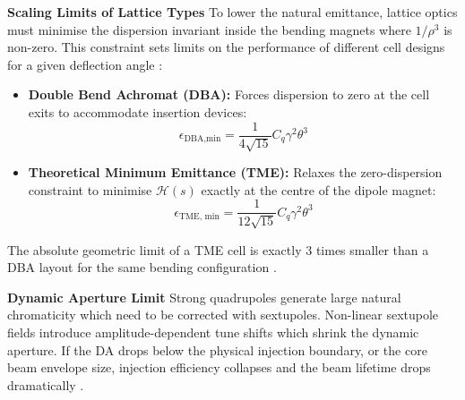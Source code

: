 \documentclass{article}
\begin{document}
\textbf{Scaling Limits of Lattice Types}
To lower the natural emittance, lattice optics must minimise the dispersion invariant inside the bending magnets where $1/\rho^3$ is non-zero. This constraint sets limits on the performance of different cell designs for a given deflection angle \cite{Wolski2014, Papaphilippou2014}:
\begin{itemize}
\item \textbf{Double Bend Achromat (DBA):} Forces dispersion to zero at the cell exits to accommodate insertion devices: $$\epsilon_{\text{DBA,min}}=\frac{1}{4\sqrt{15}}C_q\gamma^2\theta^3$$
\item \textbf{Theoretical Minimum Emittance (TME):} Relaxes the zero-dispersion constraint to minimise $\mathcal{H}(s)$ exactly at the centre of the dipole magnet: $$\epsilon_{\text{TME, min}}=\frac{1}{12\sqrt{15}}C_q\gamma^2\theta^3$$
\end{itemize}

The absolute geometric limit of a TME cell is exactly 3 times smaller than a DBA layout for the same bending configuration \cite{Wolski2014}.

\textbf{Dynamic Aperture Limit}
Strong quadrupoles generate large natural chromaticity which need to be corrected with sextupoles.
Non-linear sextupole fields introduce amplitude-dependent tune shifts which shrink the dynamic aperture. If the DA drops below the physical injection boundary, or the core beam envelope size, injection efficiency collapses and the beam lifetime drops dramatically \cite{Papaphilippou2014}.


\glsaddall

\printglossary[title=Glossary]



\end{document}
